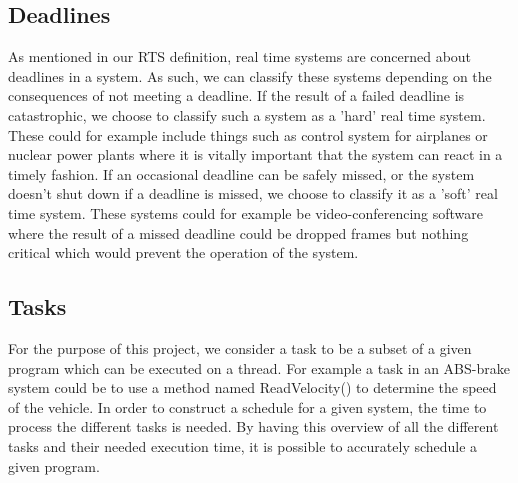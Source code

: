 \subsection{Deadlines}

As mentioned in our RTS definition, real time systems are concerned about
deadlines in a system. As such, we can classify these systems depending on the
consequences of not meeting a deadline. If the result of a failed deadline is
catastrophic, we choose to classify such a system as a 'hard' real time
system. These could for example include things such as control system for
airplanes or nuclear power plants where it is vitally important that the
system can react in a timely fashion. If an occasional deadline can be safely
missed, or the system doesn't shut down if a deadline is missed, we choose to
classify it as a 'soft' real time system. These systems could for example be 
video-conferencing software where the result of a missed deadline could be
dropped frames but nothing critical which would prevent the operation of the
system.


\subsection{Tasks}
For the purpose of this project, we consider a task to be a subset of a given
program which can be executed on a thread. For example a task in an ABS-brake
system could be to use a method named ReadVelocity() to determine the speed of
the vehicle. In order to construct a schedule for a given system, the time to
process the different tasks is needed. By having this overview of
all the different tasks and their needed execution time, it is possible to
accurately schedule a given program.


